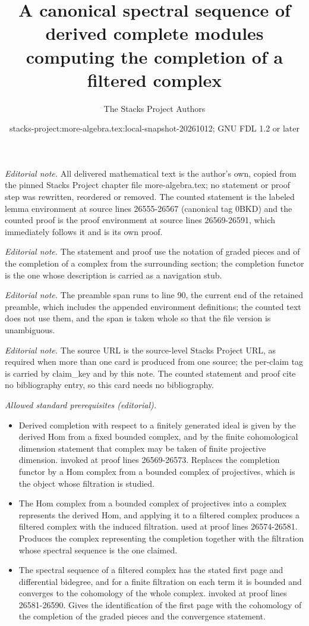 \documentclass[10pt,a4paper]{amsart}
\title{A canonical spectral sequence of derived complete modules computing the completion of a filtered complex}
\author{The Stacks Project Authors}
\date{stacks-project:more-algebra.tex:local-snapshot-20261012; GNU FDL 1.2 or later}
\theoremstyle{plain}
\theoremstyle{definition}
\theoremstyle{remark}
\numberwithin{equation}{subsection}
\begin{document}
\maketitle
\setcounter{subsection}{1}
\noindent\textit{Editorial note.} All delivered mathematical text is the author's own, copied from the pinned Stacks Project chapter file more-algebra.tex; no statement or proof step was rewritten, reordered or removed. The counted statement is the labeled lemma environment at source lines 26555-26567 (canonical tag 0BKD) and the counted proof is the proof environment at source lines 26569-26591, which immediately follows it and is its own proof.\par\medskip
\noindent\textit{Editorial note.} The statement and proof use the notation of graded pieces and of the completion of a complex from the surrounding section; the completion functor is the one whose description is carried as a navigation stub.\par\medskip
\noindent\textit{Editorial note.} The preamble span runs to line 90, the current end of the retained preamble, which includes the appended environment definitions; the counted text does not use them, and the span is taken whole so that the file version is unambiguous.\par\medskip
\noindent\textit{Editorial note.} The source URL is the source-level Stacks Project URL, as required when more than one card is produced from one source; the per-claim tag is carried by claim\_key and by this note. The counted statement and proof cite no bibliography entry, so this card needs no bibliography.\par\medskip
\noindent\textit{Allowed standard prerequisites (editorial).}\begin{itemize}
\item Derived completion with respect to a finitely generated ideal is given by the derived Hom from a fixed bounded complex, and by the finite cohomological dimension statement that complex may be taken of finite projective dimension. invoked at proof lines 26569-26573. Replaces the completion functor by a Hom complex from a bounded complex of projectives, which is the object whose filtration is studied.
\item The Hom complex from a bounded complex of projectives into a complex represents the derived Hom, and applying it to a filtered complex produces a filtered complex with the induced filtration. used at proof lines 26574-26581. Produces the complex representing the completion together with the filtration whose spectral sequence is the one claimed.
\item The spectral sequence of a filtered complex has the stated first page and differential bidegree, and for a finite filtration on each term it is bounded and converges to the cohomology of the whole complex. invoked at proof lines 26581-26590. Gives the identification of the first page with the cohomology of the completion of the graded pieces and the convergence statement.
\end{itemize}\medskip
\end{document}
